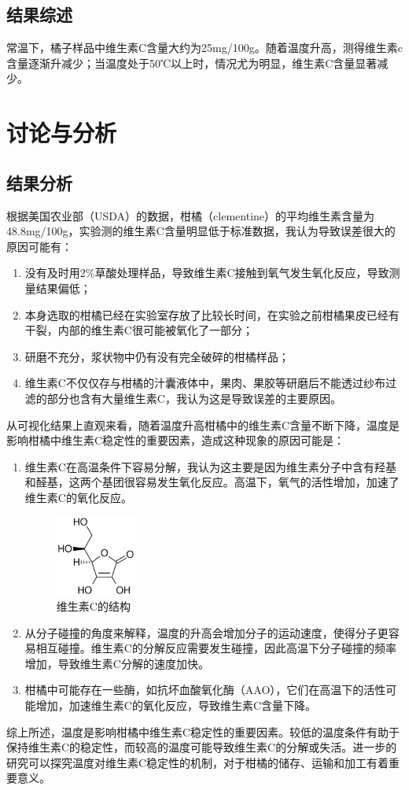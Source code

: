 \documentclass[12pt,hyperref,a4paper,UTF8]{ctexart}
\begin{document}
\subsection{结果综述}
常温下，橘子样品中维生素C含量大约为25mg/100g。随着温度升高，测得维生素c含量逐渐升减少；当温度处于50℃以上时，情况尤为明显，维生素C含量显著减少。
\section{讨论与分析}
\subsection{结果分析}
根据美国农业部（USDA）的数据，柑橘（clementine）的平均维生素含量为48.8mg/100g\cite{4}，实验测的维生素C含量明显低于标准数据，我认为导致误差很大的原因可能有：
\begin{enumerate}
	\item 没有及时用2\%草酸处理样品，导致维生素C接触到氧气发生氧化反应，导致测量结果偏低；
	\item 本身选取的柑橘已经在实验室存放了比较长时间，在实验之前柑橘果皮已经有干裂，内部的维生素C很可能被氧化了一部分；
	\item 研磨不充分，浆状物中仍有没有完全破碎的柑橘样品；
	\item 维生素C不仅仅存与柑橘的汁囊液体中，果肉、果胶等研磨后不能透过纱布过滤的部分也含有大量维生素C，我认为这是导致误差的主要原因。
\end{enumerate}

从可视化结果上直观来看，随着温度升高柑橘中的维生素C含量不断下降，温度是影响柑橘中维生素C稳定性的重要因素，造成这种现象的原因可能是\cite{5}：
\begin{enumerate}
	\item 维生素C在高温条件下容易分解，我认为这主要是因为维生素分子中含有羟基和醛基，这两个基团很容易发生氧化反应。高温下，氧气的活性增加，加速了维生素C的氧化反应。
		\begin{figure}[H]
		\centering
		\includegraphics[width=0.25\textwidth]{figures/2.png}
		\caption{维生素C的结构}
		\label{fig:your_image}
	\end{figure}
	\item 从分子碰撞的角度来解释，温度的升高会增加分子的运动速度，使得分子更容易相互碰撞。维生素C的分解反应需要发生碰撞，因此高温下分子碰撞的频率增加，导致维生素C分解的速度加快。
	\item 柑橘中可能存在一些酶，如抗坏血酸氧化酶（AAO）\cite{6}，它们在高温下的活性可能增加，加速维生素C的氧化反应，导致维生素C含量下降。
\end{enumerate}
综上所述，温度是影响柑橘中维生素C稳定性的重要因素。较低的温度条件有助于保持维生素C的稳定性，而较高的温度可能导致维生素C的分解或失活。进一步的研究可以探究温度对维生素C稳定性的机制，对于柑橘的储存、运输和加工有着重要意义。
\end{document}
